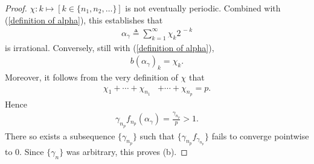 \begin{proof}
%
  $\chi: k\mapsto [k \in \{n_1, n_2, \dots\}]$ %
%
is not eventually periodic. %
Combined with (\ref{definition of alpha}), this establishes that 
%
\def\xgamma{\alpha_{\gamma}}
%
\begin{align}
  \xgamma 
    \triangleq
  \sum_{k=1}^\infty \chi_k 2^{\, \minus k}
\end{align}
%
is irrational. Conversely, still with (\ref{definition of alpha}),  %
%
\begin{align}
  b(\xgamma)_{k} = \chi_{k}.
\end{align}
%
Moreover, it follows from the very definition of $\chi$ that %
%
\begin{align}
  \chi_1 + \cdots + \chi_{n_{1}} & + \cdots + \chi_{n_{p}} = p.
\end{align}
%
Hence %
%
\begin{align}
  \gamma_{n_p} f_{n_{p}}(\xgamma) = \frac{\gamma_{n_p}}{p} > 1.
\end{align}
%
There so exists a subsequence $\{\gamma_{n_p}\}$ such that %
%
$\{\gamma_{n_p} f_{\gamma_{n_p}}\}$ %
%
fails to converge pointwise to $0$. %
Since $\{\gamma_{n}\}$ was arbitrary, this proves (b).
\end{proof}

